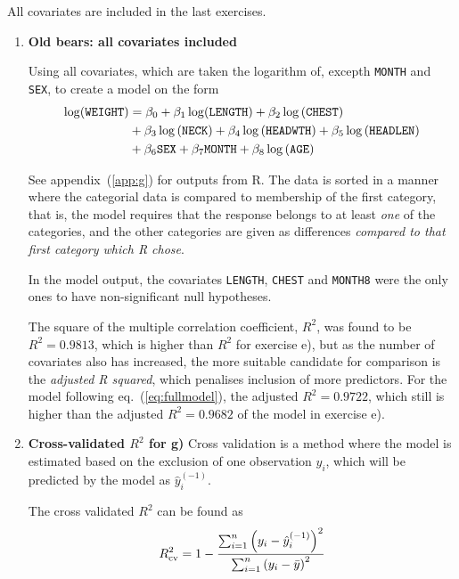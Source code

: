 \documentclass[a4paper,11pt]{article}
\begin{document}
All covariates are included in the last exercises.

\begin{enumerate}[resume*]
    \item \textbf{Old bears: all covariates included}

        Using all covariates, which are taken the logarithm of, excepth \texttt{MONTH} and \texttt{SEX}, to create a model on the form
\begin{align}
    \log(\mathtt{WEIGHT}) &= \beta_0 + \beta_1 \log(\mathtt{LENGTH}) + \beta_2 \log\left( \mathtt{CHEST} \right) \notag \\
    &+ \beta_3 \log \left( \mathtt{NECK} \right) + \beta_4 \log\left( \mathtt{HEADWTH} \right) + \beta_5 \log \left( \mathtt{HEADLEN} \right) \notag \\
    &+ \beta_6 \mathtt{SEX} + \beta_7 \mathtt{MONTH} + \beta_8 \log \left( \mathtt{AGE} \right)
    \label{eq:fullmodel}
\end{align}

See appendix~(\ref{app:g}) for outputs from R. The data is sorted in a manner where the categorial data is compared to membership of the first category, that is, the model requires that the response belongs to at least \textit{one} of the categories, and the other categories are given as differences \textit{compared to that first category which R chose}. 

In the model output, the covariates \texttt{LENGTH}, \texttt{CHEST} and \texttt{MONTH8} were the only ones to have non-significant null hypotheses. 

The square of the multiple  correlation coefficient, $R^2$, was found to be $R^2 = 0.9813$, which is higher than $R^2$ for exercise e), but as the number of covariates also has increased, the more suitable candidate for comparison is the \textit{adjusted R squared}, which penalises inclusion of more predictors. For the model following eq.~(\ref{eq:fullmodel}), the adjusted $R^2 = 0.9722$, which still is higher than the adjusted $R^2 = 0.9682$ of the model in exercise e). 

    \item \textbf{Cross-validated $R^2$ for g)}
        Cross validation is a method where the model is estimated based on the exclusion of one observation $y_i$, which will be predicted by the model as $\hat{y}_i^{(-1)}$. 

        The cross validated $R^2$ can be found as
        \begin{equation}
            R_{\rm cv}^2 = 1 - \frac{\sum_{i=1}^n \left( y_i - \hat{y}^{(-1)}_i \right)^2}{ \sum_{i=1}^n \left( y_i - \bar{y} \right)^2}
            \label{eq:rsquared_crossval}
        \end{equation}


\end{enumerate}
\end{document}
